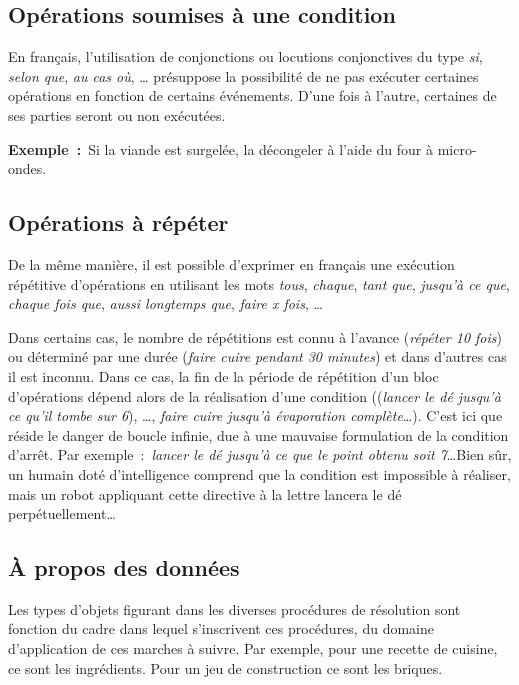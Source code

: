 	\subsection{Opérations soumises à une condition}

		En français, l’utilisation de conjonctions ou locutions conjonctives du
		type \textit{si}, \textit{selon que}, \textit{au cas où}, \dots{}
		présuppose la possibilité de ne pas exécuter certaines opérations en
		fonction de certains événements. 
		D’une fois à l’autre, 
		certaines de ses parties seront ou non exécutées.
		
		\textbf{Exemple~:}~Si la viande est surgelée, la décongeler à
		l’aide du four à micro-ondes.

	\subsection{Opérations à répéter}

		De la même manière, il est possible d’exprimer en français une exécution
		répétitive d’opérations en utilisant les mots \textit{tous},
		\textit{chaque}, \textit{tant que}, \textit{jusqu’à ce que},
		\textit{chaque fois que}, \textit{aussi longtemps que}, 
		\textit{faire x fois}, \dots 
		
		Dans certains cas, le nombre de répétitions est connu à l’avance
		(\textit{répéter 10 fois}) ou déterminé par une durée (\textit{faire
		cuire pendant 30 minutes}) et dans d’autres cas il est inconnu.
		Dans ce cas, la fin de la période
		de répétition d’un bloc d’opérations dépend alors de la réalisation
		d’une condition ((\textit{lancer le dé jusqu’à ce
		qu’il tombe sur 6}), \dots, \textit{faire cuire
		jusqu’à évaporation complète}\dots). C’est ici que réside le danger de
		boucle infinie, due à une mauvaise formulation de la condition d’arrêt.
		Par exemple~:~\textit{lancer le dé jusqu’à ce que le point 
		obtenu soit 7}\dots Bien sûr, un humain doté d’intelligence 
		comprend que la condition est impossible à réaliser, mais un robot 
		appliquant cette directive à la lettre lancera le dé 
		perpétuellement\dots

	\subsection{À propos des données}

		Les types d’objets figurant dans les diverses procédures de résolution
		sont fonction du cadre dans lequel s’inscrivent ces procédures, du
		domaine d’application de ces marches à suivre. Par exemple, pour une
		recette de cuisine, ce sont les ingrédients. Pour un jeu de
		construction ce sont les briques.
		

